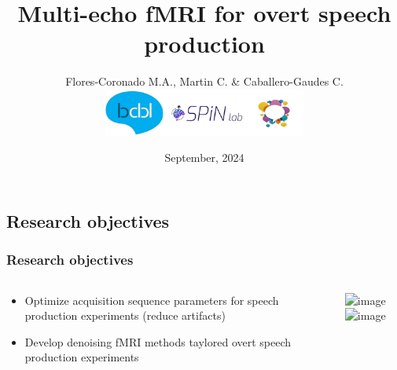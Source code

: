 \documentclass[aspectratio=169]{beamer}
\title[Multi-echo fMRI for overt speech production ]{Multi-echo fMRI for overt speech production }
\date{September, 2024 }
\author{Flores-Coronado M.A., Martin C. \& Caballero-Gaudes C. \vspace{1.4cm}
\includegraphics[width=0.5\textwidth]{images/BCBL_SPiN}}
\begin{document}
\begin{frame}
	\maketitle
\end{frame}


\subsection{Research objectives}

\begin{frame}
\frametitle{Research objectives}
\begin{columns}
\begin{small}
\begin{itemize}
	\item<1>{Optimize acquisition sequence parameters for speech production experiments (reduce artifacts)}
\item<2>{Develop denoising fMRI methods taylored overt speech production experiments}
\end{itemize}
\end{small}
\includegraphics<1>[width=\textwidth]{images/noise} 
\includegraphics<2>[width=\textwidth]{images/multiecho} 
\end{columns}
\end{frame}
\end{document}
